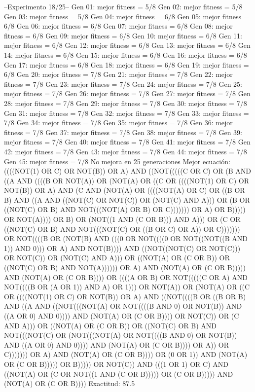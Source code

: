 --Experimento 
 18/25--
Gen 01: mejor fitness = 5/8
Gen 02: mejor fitness = 5/8
Gen 03: mejor fitness = 5/8
Gen 04: mejor fitness = 6/8
Gen 05: mejor fitness = 6/8
Gen 06: mejor fitness = 6/8
Gen 07: mejor fitness = 6/8
Gen 08: mejor fitness = 6/8
Gen 09: mejor fitness = 6/8
Gen 10: mejor fitness = 6/8
Gen 11: mejor fitness = 6/8
Gen 12: mejor fitness = 6/8
Gen 13: mejor fitness = 6/8
Gen 14: mejor fitness = 6/8
Gen 15: mejor fitness = 6/8
Gen 16: mejor fitness = 6/8
Gen 17: mejor fitness = 6/8
Gen 18: mejor fitness = 6/8
Gen 19: mejor fitness = 6/8
Gen 20: mejor fitness = 7/8
Gen 21: mejor fitness = 7/8
Gen 22: mejor fitness = 7/8
Gen 23: mejor fitness = 7/8
Gen 24: mejor fitness = 7/8
Gen 25: mejor fitness = 7/8
Gen 26: mejor fitness = 7/8
Gen 27: mejor fitness = 7/8
Gen 28: mejor fitness = 7/8
Gen 29: mejor fitness = 7/8
Gen 30: mejor fitness = 7/8
Gen 31: mejor fitness = 7/8
Gen 32: mejor fitness = 7/8
Gen 33: mejor fitness = 7/8
Gen 34: mejor fitness = 7/8
Gen 35: mejor fitness = 7/8
Gen 36: mejor fitness = 7/8
Gen 37: mejor fitness = 7/8
Gen 38: mejor fitness = 7/8
Gen 39: mejor fitness = 7/8
Gen 40: mejor fitness = 7/8
Gen 41: mejor fitness = 7/8
Gen 42: mejor fitness = 7/8
Gen 43: mejor fitness = 7/8
Gen 44: mejor fitness = 7/8
Gen 45: mejor fitness = 7/8
No mejora en 25 generaciones
Mejor ecuación: ((((NOT(1) OR C) OR NOT(B)) OR A) AND ((NOT(((((C OR C) OR (B AND ((A AND ((((B OR NOT(A)) OR (NOT(A) OR ((C OR ((((NOT(1) OR C) OR NOT(B)) OR A) AND (C AND (NOT(A) OR ((((NOT(A) OR C) OR ((B OR B) AND ((A AND ((NOT(C) OR NOT(C)) OR (NOT(C) AND A))) OR (B OR ((NOT(C) OR B) AND NOT(((NOT(A) OR B) OR C))))))) OR A) OR B))))) OR NOT(A)))) OR B) OR (NOT((1 AND (C OR B))) AND A))) OR (C OR ((NOT(C) OR B) AND NOT(((NOT(C) OR ((B OR C) OR A)) OR C))))))) OR NOT((((B OR (NOT(B) AND (((0 OR NOT((((0 OR NOT((NOT((B AND 1)) AND 0))) OR A) AND NOT(B)))) AND ((NOT((NOT(C) OR NOT(C))) OR NOT(C)) OR (NOT(C) AND A))) OR ((NOT(A) OR (C OR B)) OR ((NOT(C) OR B) AND NOT(A)))))) OR A) AND (NOT(A) OR (C OR B))))) AND (NOT(A) OR (C OR B)))) OR ((((A OR B) OR NOT(((((C OR A) AND NOT((((B OR (A OR 1)) AND A) OR 1))) OR NOT(A)) OR (NOT(A) OR ((C OR ((((NOT(1) OR C) OR NOT(B)) OR A) AND ((NOT((((B OR ((B OR B) AND ((A AND ((NOT(((NOT(A) OR NOT((((B AND 0) OR NOT(B)) AND ((A OR 0) AND 0)))) AND (NOT(A) OR (C OR B)))) OR NOT(C)) OR (C AND A))) OR ((NOT(A) OR (C OR B)) OR ((NOT(C) OR B) AND NOT(((NOT(C) OR (NOT(((NOT(A) OR NOT((((B AND 0) OR NOT(B)) AND ((A OR 0) AND 0)))) AND (NOT(A) OR (C OR B)))) OR A)) OR C))))))) OR A) AND (NOT(A) OR (C OR B)))) OR (0 OR 1)) AND (NOT(A) OR (C OR B))))) OR B))))) OR NOT(C)) AND (((1 OR 1) OR C) AND ((NOT(A) OR (C OR NOT((1 AND (C OR B))))) OR (C OR B))))) AND (NOT(A) OR (C OR B))))
 Exactitud: 87.5%

